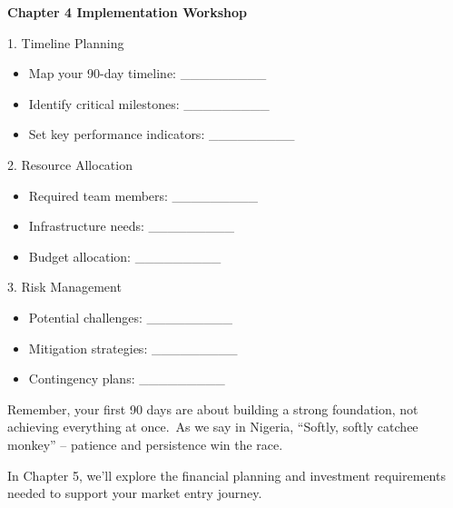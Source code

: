 \begin{workshopbox}
\textbf{Chapter 4 Implementation Workshop}

1. Timeline Planning
\begin{itemize}
    \item Map your 90-day timeline: \_\_\_\_\_\_\_\_\_
    \item Identify critical milestones: \_\_\_\_\_\_\_\_\_
    \item Set key performance indicators: \_\_\_\_\_\_\_\_\_
\end{itemize}

2. Resource Allocation
\begin{itemize}
    \item Required team members: \_\_\_\_\_\_\_\_\_
    \item Infrastructure needs: \_\_\_\_\_\_\_\_\_
    \item Budget allocation: \_\_\_\_\_\_\_\_\_
\end{itemize}

3. Risk Management
\begin{itemize}
    \item Potential challenges: \_\_\_\_\_\_\_\_\_
    \item Mitigation strategies: \_\_\_\_\_\_\_\_\_
    \item Contingency plans: \_\_\_\_\_\_\_\_\_
\end{itemize}
\end{workshopbox}

\begin{importantbox}
Remember, your first 90 days are about building a strong foundation, not achieving everything at once.\ As we say in Nigeria, ``Softly, softly catchee monkey'' – patience and persistence win the race.

In Chapter 5, we'll explore the financial planning and investment requirements needed to support your market entry journey.
\end{importantbox}
